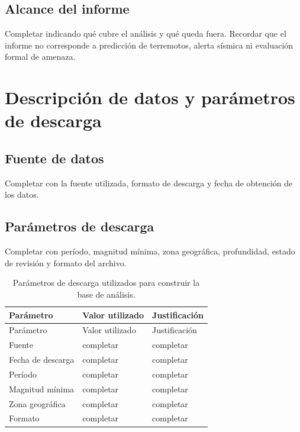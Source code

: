 \documentclass[
  spanish,
  letterpaper,
  DIV=11,
  numbers=noendperiod]{scrartcl}
\begin{document}
\subsection{Alcance del informe}\label{alcance-del-informe}

Completar indicando qué cubre el análisis y qué queda fuera. Recordar
que el informe no corresponde a predicción de terremotos, alerta sísmica
ni evaluación formal de amenaza.

\section{Descripción de datos y parámetros de
descarga}\label{descripciuxf3n-de-datos-y-paruxe1metros-de-descarga}

\subsection{Fuente de datos}\label{fuente-de-datos}

Completar con la fuente utilizada, formato de descarga y fecha de
obtención de los datos.

\subsection{Parámetros de descarga}\label{paruxe1metros-de-descarga}

Completar con período, magnitud mínima, zona geográfica, profundidad,
estado de revisión y formato del archivo.

\begin{longtable}[]{@{}lll@{}}
\caption{Parámetros de descarga utilizados para construir la base de
análisis.}\label{tbl-parametros-descarga}\tabularnewline
\toprule\noalign{}
Parámetro & Valor utilizado & Justificación \\
\midrule\noalign{}
\endfirsthead
\toprule\noalign{}
Parámetro & Valor utilizado & Justificación \\
\midrule\noalign{}
\endhead
\bottomrule\noalign{}
\endlastfoot
Fuente & completar & completar \\
Fecha de descarga & completar & completar \\
Período & completar & completar \\
Magnitud mínima & completar & completar \\
Zona geográfica & completar & completar \\
Formato & completar & completar \\
\end{longtable}
\end{document}
